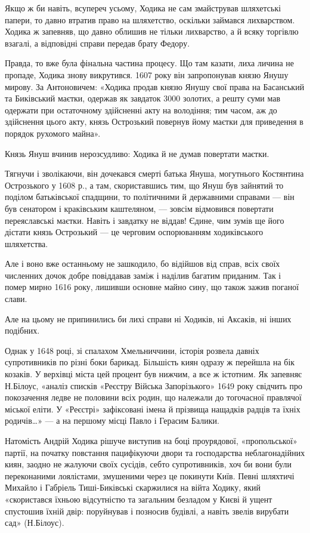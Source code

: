 Якщо ж би навіть, всупереч усьому, Ходика не сам змайстрував шляхетські папери,
то давно втратив право на шляхетство, оскільки займався лихварством. Ходика ж
запевняв, що давно облишив не тільки лихварство, а й всяку торгівлю взагалі, а
відповідні справи передав брату Федору.

Правда, то вже була фінальна частина процесу. Що там казати, лиха личина не
пропаде, Ходика знову викрутився. 1607 року він запропонував князю Янушу
мирову. За Антоновичем: «Ходика продав князю Янушу свої права на Басанський та
Биківський маєтки, одержав як завдаток 3000 золотих, а решту суми мав одержати
при остаточному здійсненні акту на володіння; тим часом, аж до здійснення цього
акту, князь Острозький повернув йому маєтки для приведення в порядок рухомого
майна».

Князь Януш вчинив нерозсудливо: Ходика й не думав повертати маєтки. 

Тягнучи і зволікаючи, він дочекався смерті батька Януша, могутнього Костянтина
Острозького у 1608 р., а там, скориставшись тим, що Януш був зайнятий то
поділом батьківської спадщини, то політичними й державними справами — він був
сенатором і краківським каштеляном, — зовсім відмовився повертати переяславські
маєтки. Навіть і завдатку не віддав! Єдине, чим зумів ще його дістати князь
Острозький — це черговим оспорюванням ходиківського шляхетства. 

Але і воно вже останньому не зашкодило, бо відійшов від справ, всіх своїх
численних дочок добре повіддавав заміж і наділив багатим приданим. Так і помер
мирно 1616 року, лишивши основне майно сину, що також зажив поганої слави. 

Але на цьому не припинились би лихі справи ні Ходиків, ні Аксаків, ні інших
подібних.

Однак у 1648 році, зі спалахом Хмельниччини, історія розвела давніх
супротивників по різні боки барикад. Більшість киян одразу ж перейшла на бік
козаків. У верхівці міста цей процент був нижчим, а все ж істотним. Як запевняє
Н.Білоус, «аналіз списків «Реєстру Війська Запорізького» 1649 року свідчить про
покозачення ледве не половини всіх родин, що належали до тогочасної правлячої
міської еліти. У «Реєстрі» зафіксовані імена й прізвища нащадків радців та
їхніх родичів…» — а на першому місці Павло і Герасим Балики.

Натомість Андрій Ходика рішуче виступив на боці проурядової, «пропольської»
партії, на початку повстання пацифікуючи двори та господарства неблагонадійних
киян, заодно не жалуючи своїх сусідів, себто супротивників, хоч би вони були
переконаними лоялістами, змушеними через це покинути Київ. Певні шляхтичі
Михайло і Габріель Тиші-Биківські скаржилися на війта Ходику, який «скористався
їхньою відсутністю та загальним безладом у Києві й ущент спустошив їхній двір:
поруйнував і позносив будівлі, а навіть звелів вирубати сад» (Н.Білоус).

